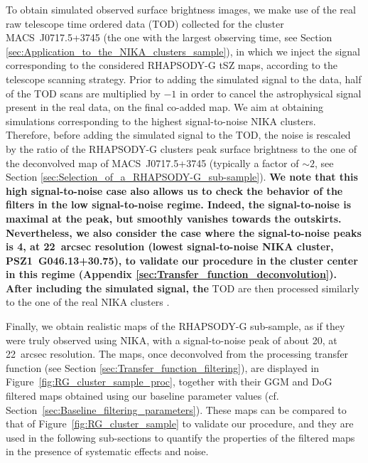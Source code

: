 \documentclass[twocolumn,traditabstract]{aa}
\begin{document}
To obtain simulated observed surface brightness images, we make use of the real raw telescope time ordered data (TOD) collected for the cluster \mbox{MACS~J0717.5+3745} (the one with the largest observing time, see Section \ref{sec:Application_to_the_NIKA_clusters_sample}), in which we inject the signal corresponding to the considered RHAPSODY-G tSZ maps, according to the telescope scanning strategy. Prior to adding the simulated signal to the data, half of the TOD scans are multiplied by $-1$ in order to cancel the astrophysical signal present in the real data, on the final co-added map. We aim at obtaining simulations corresponding to the highest signal-to-noise NIKA clusters. Therefore, before adding the simulated signal to the TOD, the noise is rescaled by the ratio of the RHAPSODY-G clusters peak surface brightness to the one of the deconvolved map of \mbox{MACS~J0717.5+3745} (typically a factor of $\sim 2$, see Section \ref{sec:Selection_of_a_RHAPSODY-G_sub-sample}). {\bf We note that this high signal-to-noise case also allows us to check the behavior of the filters in the low signal-to-noise regime. Indeed, the signal-to-noise is maximal at the peak, but smoothly vanishes towards the outskirts. Nevertheless, we also consider the case where the signal-to-noise peaks is 4, at 22~arcsec resolution (lowest signal-to-noise NIKA cluster, \mbox{PSZ1~G046.13+30.75}), to validate our procedure in the cluster center in this regime (Appendix \ref{sec:Transfer_function_deconvolution}). After including the simulated signal, the} TOD are then processed similarly to the one of the real NIKA clusters \citep[see][for more details]{Adam2015}.

Finally, we obtain realistic maps of the RHAPSODY-G sub-sample, as if they were truly observed using NIKA, with a signal-to-noise peak of about 20, at 22~arcsec resolution. The maps, once deconvolved from the processing transfer function (see Section \ref{sec:Transfer_function_filtering}), are displayed in Figure~\ref{fig:RG_cluster_sample_proc}, together with their GGM and DoG filtered maps obtained using our baseline parameter values (cf. Section~\ref{sec:Baseline_filtering_parameters}). These maps can be compared to that of Figure~\ref{fig:RG_cluster_sample} to validate our procedure, and they are used in the following sub-sections to quantify the properties of the filtered maps in the presence of systematic effects and noise.

\end{document}
